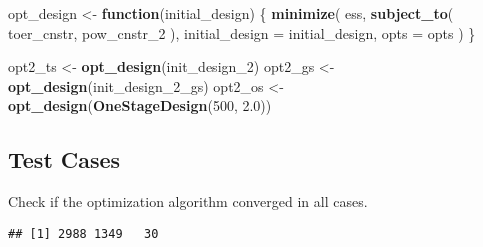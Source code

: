 \documentclass[]{book}
\newenvironment{Shaded}{\begin{snugshade}}{\end{snugshade}}
\newcommand{\ControlFlowTok}[1]{\textcolor[rgb]{0.13,0.29,0.53}{\textbf{#1}}}
\newcommand{\DataTypeTok}[1]{\textcolor[rgb]{0.13,0.29,0.53}{#1}}
\newcommand{\DecValTok}[1]{\textcolor[rgb]{0.00,0.00,0.81}{#1}}
\newcommand{\FloatTok}[1]{\textcolor[rgb]{0.00,0.00,0.81}{#1}}
\newcommand{\KeywordTok}[1]{\textcolor[rgb]{0.13,0.29,0.53}{\textbf{#1}}}
\newcommand{\NormalTok}[1]{#1}
\newcommand{\OperatorTok}[1]{\textcolor[rgb]{0.81,0.36,0.00}{\textbf{#1}}}
\newcommand{\StringTok}[1]{\textcolor[rgb]{0.31,0.60,0.02}{#1}}
\begin{document}
\begin{Shaded}
\begin{Highlighting}[]
\NormalTok{opt_design <-}\StringTok{ }\ControlFlowTok{function}\NormalTok{(initial_design) \{}
    \KeywordTok{minimize}\NormalTok{(}
\NormalTok{        ess,}
        \KeywordTok{subject_to}\NormalTok{(}
\NormalTok{            toer_cnstr,}
\NormalTok{            pow_cnstr_}\DecValTok{2}
\NormalTok{        ),}
        \DataTypeTok{initial_design =}\NormalTok{ initial_design,}
        \DataTypeTok{opts =}\NormalTok{ opts}
\NormalTok{    )}
\NormalTok{\}}

\NormalTok{opt2_ts <-}\StringTok{ }\KeywordTok{opt_design}\NormalTok{(init_design_}\DecValTok{2}\NormalTok{)}
\NormalTok{opt2_gs <-}\StringTok{ }\KeywordTok{opt_design}\NormalTok{(init_design_}\DecValTok{2}\NormalTok{_gs)}
\NormalTok{opt2_os <-}\StringTok{ }\KeywordTok{opt_design}\NormalTok{(}\KeywordTok{OneStageDesign}\NormalTok{(}\DecValTok{500}\NormalTok{, }\FloatTok{2.0}\NormalTok{))}
\end{Highlighting}
\end{Shaded}

\hypertarget{test-cases-8}{%
\subsection{Test Cases}\label{test-cases-8}}

Check if the optimization algorithm converged in all cases.

\begin{Shaded}
\end{Shaded}

\begin{verbatim}
## [1] 2988 1349   30
\end{verbatim}

\begin{Shaded}
\end{Shaded}
\end{document}
